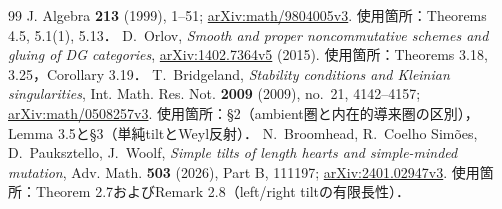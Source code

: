 \documentclass[11pt,a4paper]{ltjsarticle}
\theoremstyle{definition}
\begin{document}
\begin{thebibliography}{99}
J. Algebra \textbf{213} (1999), 1--51;
\href{https://arxiv.org/abs/math/9804005}{arXiv:math/9804005v3}.
使用箇所：Theorems 4.5, 5.1(1), 5.13．
D.~Orlov, \emph{Smooth and proper noncommutative schemes and gluing of DG categories},
\href{https://arxiv.org/abs/1402.7364}{arXiv:1402.7364v5} (2015).
使用箇所：Theorems 3.18, 3.25，Corollary 3.19．
T.~Bridgeland, \emph{Stability conditions and Kleinian singularities},
Int. Math. Res. Not. \textbf{2009} (2009), no.~21, 4142--4157;
\href{https://arxiv.org/abs/math/0508257}{arXiv:math/0508257v3}.
使用箇所：\S2（ambient圏と内在的導来圏の区別），Lemma 3.5と\S3（単純tiltとWeyl反射）．
N.~Broomhead, R.~Coelho Sim\~oes, D.~Pauksztello, J.~Woolf,
\emph{Simple tilts of length hearts and simple-minded mutation},
Adv. Math. \textbf{503} (2026), Part B, 111197;
\href{https://arxiv.org/abs/2401.02947}{arXiv:2401.02947v3}.
使用箇所：Theorem 2.7およびRemark 2.8（left/right tiltの有限長性）．
\end{thebibliography}
\end{document}
